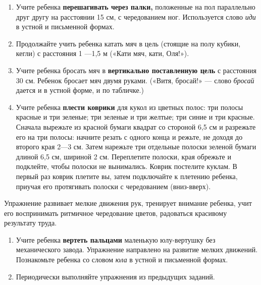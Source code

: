 \documentclass[a5paper]{book}
\renewcommand{\emph}[1]{\textit{#1}}
\begin{document}
\begin{enumerate}
\def\labelenumi{\arabic{enumi}.}
\setcounter{enumi}{1}
\item
  
  Учите ребенка \textbf{перешагивать через палки,} положенные на пол
  параллельно друг другу на расстоянии 15 см, с чередованием ног.
  Используется слово \emph{иди} в устной и письменной формах.
  
\item
  
  Продолжайте учить ребенка катать мяч в цель (стоящие на полу кубики,
  кегли) с расстояния 1 ---1,5 м («Кати мяч, кати, Оля!»).
  
\item
  
  Учите ребенка бросать мяч в \textbf{вертикально поставленную цель} с
  расстояния 30 см. Ребенок бросает мяч двумя руками. («Витя, бросай!»
  --- слово \emph{бросай} дается и в устной форме, и по табличке.)
  
\item
  
  Учите ребенка \textbf{плести коврики} для кукол из цветных полос: три
  полосы красные и три зеленые; три зеленые и три желтые; три синие и
  три красные. Сначала вырежьте из красной бумаги квадрат со стороной
  6,5 см и разрежьте его на три полосы: начните резать с одного конца и
  режьте, не доходя до второго края 2---3 см. Затем нарежьте три
  отдельные полоски зеленой бумаги длиной 6,5 см, шириной 2 см.
  Переплетите полоски, края обрежьте и подклейте, чтобы полоски не
  вынимались. Коврик постелите куклам. В первый раз коврик плетите вы,
  затем подключайте к плетению ребенка, приучая его протягивать полоски
  с чередованием (вниз-вверх).
  
\end{enumerate}


Упражнение развивает мелкие движения рук, тренирует внимание ребенка,
учит его воспринимать ритмичное чередование цветов, радоваться красивому
результату труда.


\begin{enumerate}
\def\labelenumi{\arabic{enumi}.}
\setcounter{enumi}{5}
\item
  
  Учите ребенка \textbf{вертеть пальцами} маленькую юлу-вертушку без
  механического завода. Упражнение направлено на развитие мелких
  движений. Познакомьте ребенка со словом \emph{юла} в устной и
  письменной формах.
  
\item
  
  Периодически выполняйте упражнения из предыдущих заданий.
  
\end{enumerate}
\end{document}
